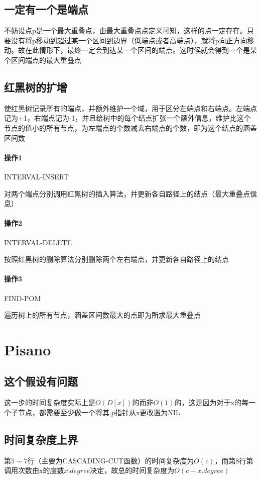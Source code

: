 \documentclass[]{report}
\begin{document}
		\subsection{一定有一个是端点}
		不妨设点p是一个最大重叠点，由最大重叠点点定义可知，这样的点一定存在。只要没有将p移动到超过某一个区间到边界（低端点或者高端点），就将p向正方向移动。故在此情形下，最终一定会到达某一个区间的端点。这时候就会得到一个是某个区间端点的最大重叠点
		\subsection{红黑树的扩增}
		使红黑树记录所有的端点，并额外维护一个域，用于区分左端点和右端点。左端点记为+1，右端点记为-1，并且给树中的每个结点扩张一个额外信息，维护比这个节点的值小的所有节点，为左端点的个数减去右端点的个数，即为这个结点的涵盖区间数\par
		\paragraph{操作1}INTERVAL-INSERT\par
		对两个端点分别调用红黑树的插入算法，并更新各自路径上的结点（最大重叠点信息）
		\paragraph{操作2}INTERVAL-DELETE\par
		按照红黑树的删除算法分别删除两个左右端点，并更新各自路径上的结点
		\paragraph{操作3}FIND-POM\par
		遍历树上的所有节点，涵盖区间数最大的点即为所求最大重叠点

		\section{Pisano}
		\subsection{这个假设有问题}
		这一步的时间复杂度实际上是$O(D[x])$的而非$O(1)$的，这是因为对于x的每一个子节点，都需要至少做一个将其$.p$指针从x更改置为NIL
		\subsection{时间复杂度上界}
		第$5\sim7$行（主要为CASCADING-CUT函数）的时间复杂度为$O(c)$，而第8行第调用次数由x的度数$x.degree$决定，故总的时间复杂度为$O(c+x.degree)$
\end{document}
